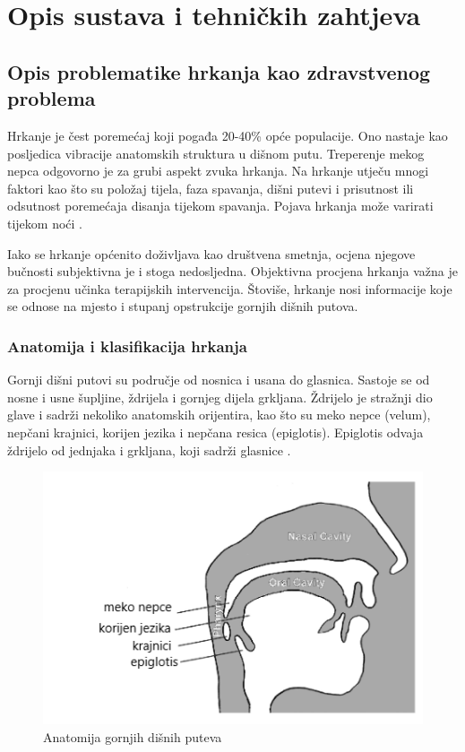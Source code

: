 \chapter{Opis sustava i tehničkih zahtjeva}

\section{Opis problematike hrkanja kao zdravstvenog problema}

Hrkanje je čest poremećaj koji pogađa 20-40\% opće populacije. Ono nastaje kao posljedica vibracije anatomskih struktura u dišnom putu. Treperenje mekog nepca odgovorno je za grubi aspekt zvuka hrkanja. Na hrkanje utječu mnogi faktori kao što su položaj tijela, faza spavanja, dišni putevi i prisutnost ili odsutnost poremećaja disanja tijekom spavanja. Pojava hrkanja može varirati tijekom noći \cite{pevernagie}. 

Iako se hrkanje općenito doživljava kao društvena smetnja, ocjena njegove bučnosti subjektivna je i stoga nedosljedna. Objektivna procjena hrkanja važna je za procjenu učinka terapijskih intervencija. Štoviše, hrkanje nosi informacije koje se odnose na mjesto i stupanj opstrukcije gornjih dišnih putova.

\subsection{Anatomija i klasifikacija hrkanja}
Gornji dišni putovi su područje od nosnica i usana do glasnica. Sastoje se od nosne i usne šupljine, ždrijela i gornjeg dijela grkljana. Ždrijelo je stražnji dio glave i sadrži nekoliko anatomskih orijentira, kao što su meko nepce (velum), nepčani krajnici, korijen jezika i nepčana resica (epiglotis). Epiglotis odvaja ždrijelo od jednjaka i grkljana, koji sadrži glasnice \cite{snoringml}.

\begin{figure}[ht]
	\centering
	\includegraphics[scale=0.7]{imgs/anatomy}
	\caption{Anatomija gornjih dišnih puteva \cite{snoringml}}
	\label{fig:anatomy}
\end{figure}

